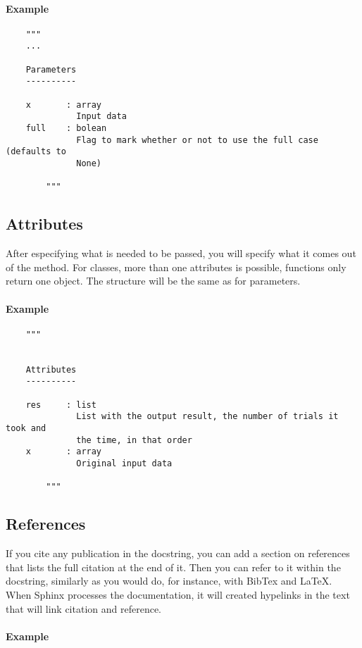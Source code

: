\documentclass{article}
\begin{document}
\paragraph{Example}

\begin{verbatim}
    """
    ...

    Parameters
    ----------

    x       : array
              Input data
    full    : bolean
              Flag to mark whether or not to use the full case (defaults to
              None)

        """
\end{verbatim}

\subsection{Attributes}
After especifying what is needed to be passed, you will specify what it comes
out of the method. For classes, more than one attributes is possible, 
functions only return one object. The structure will be the same as for
parameters.

\paragraph{Example}

\begin{verbatim}
    """
       

    Attributes
    ----------

    res     : list
              List with the output result, the number of trials it took and
              the time, in that order
    x       : array
              Original input data

        """
\end{verbatim}

\subsection{References}
If you cite any publication in the docstring, you can add a section on
references that lists the full citation at the end of it. Then you can refer
to it within the docstring, similarly as you would do, for instance, with
BibTex and \LaTeX. When Sphinx processes the documentation, it will created
hypelinks in the text that will link citation and reference.

\paragraph{Example}
\end{document}

